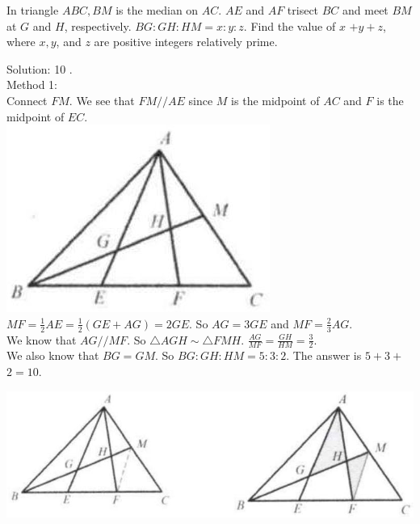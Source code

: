 \documentclass{article}
\begin{document}
In triangle \(A B C, B M\) is the median on \(A C\). \(A E\) and \(A F\) trisect \(B C\) and meet \(B M\) at \(G\) and \(H\), respectively. \(B G: G H: H M=x: y: z\). Find the value of \(x\) \(+y+z\), where \(x, y\), and \(z\) are positive integers relatively prime.

Solution: 10 .\\
Method 1:\\
Connect \(F M\). We see that \(F M / / A E\) since \(M\) is the midpoint of \(A C\) and \(F\) is the midpoint of \(E C\).\\
\centering
\includegraphics[width=\textwidth]{images/118.jpg}\\
\(M F=\frac{1}{2} A E=\frac{1}{2}(G E+A G)=2 G E\). So \(A G=3 G E\) and \(M F=\frac{2}{3} A G\).\\
We know that \(A G / / M F\). So \(\triangle A G H \sim \triangle F M H\). \(\frac{A G}{M F}=\frac{G H}{H M}=\frac{3}{2}\).\\
We also know that \(B G=G M\). So \(B G: G H: H M=5: 3: 2\). The answer is \(5+3+\) \(2=10\).


\begin{center}
\includegraphics[width=\textwidth]{images/119.jpg}
\end{center}
\end{document}
